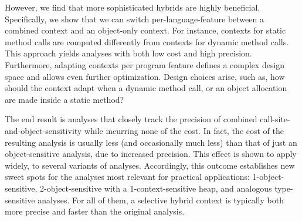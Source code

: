 However, we find that more sophisticated hybrids are highly
beneficial. Specifically, we show that we can switch
per-language-feature between a combined context and an object-only
context. For instance, contexts for static method calls are computed
differently from contexts for dynamic method calls. This approach
yields analyses with both low cost and high precision.  Furthermore,
adapting contexts per program feature defines a complex design space
and allows even further optimization. Design choices arise, such as,
how should the context adapt when a dynamic method call, or an object
allocation are made inside a static method?

The end result is analyses that closely track the precision of
combined call-site-and-object-sensitivity while incurring none of the
cost. In fact, the cost of the resulting analysis is usually less
(and occasionally much less) than that of just an object-sensitive
analysis, due to increased precision. This effect is shown to apply
widely, to several variants of analyses. Accordingly, this outcome
establishes new sweet spots for the analyses most relevant for
practical applications: 1-object-sensitive, 2-object-sensitive with a
1-context-sensitive heap, and analogous type-sensitive
\cite{popl:2011:Smaragdakis} analyses. For all of them, a selective hybrid
context is typically both more precise and faster than the original
analysis. 



